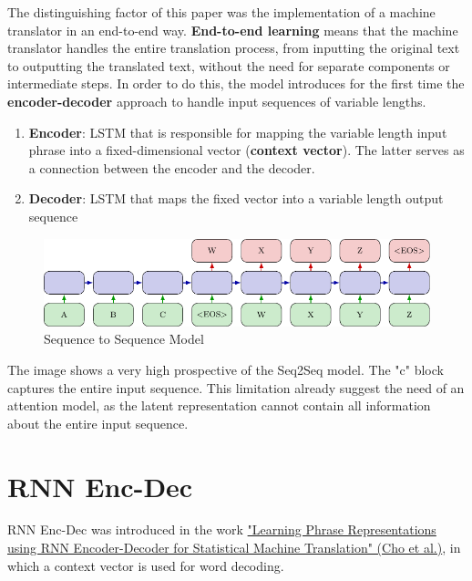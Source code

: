 The distinguishing factor of this paper was the implementation of a machine translator in an end-to-end way. \textbf{End-to-end learning} means that the machine translator handles the entire translation process, from inputting the original text to outputting the translated text, without the need for separate components or intermediate steps. In order to do this, the model introduces for the first time the \textbf{encoder-decoder} approach to handle input sequences of variable lengths. 

\begin{enumerate}
    \item \textbf{Encoder}: LSTM that is responsible for mapping the variable length input phrase into a fixed-dimensional vector (\textbf{context vector}). The latter serves as a connection between the encoder and the decoder.
    \item \textbf{Decoder}: LSTM that maps the fixed vector into a variable length output sequence
\end{enumerate}

\begin{figure}[!htbp]
    \centering
    \includegraphics[width=\linewidth]{tikz/chapter7 - Seq2Seq.pdf}
    \caption{Sequence to Sequence Model}
\end{figure}

The image shows a very high prospective of the Seq2Seq model. The "c" block captures the entire input sequence. This limitation already suggest the need of an attention model, as the latent representation cannot contain all information about the entire input sequence.

\section{RNN Enc-Dec}
RNN Enc-Dec was introduced in the work \href{https://arxiv.org/pdf/1409.3215}{"Learning Phrase Representations using RNN Encoder-Decoder for Statistical Machine Translation" (Cho et al.)}, in which a context vector is used for word decoding.

